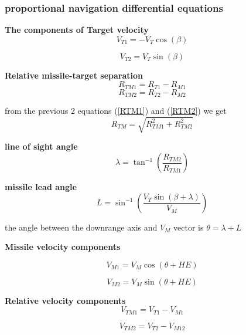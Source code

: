 \subsubsection*{proportional navigation differential equations}

\textbf{The components of Target velocity} 
\begin{equation}
V_{T1} = - V_T \cos(\beta)
\end{equation}

\begin{equation}
V_{T2} =  V_T \sin(\beta)
\end{equation}

\textbf{Relative missile-target separation}
\begin{equation}
R_{TM1} = R_{T1} - R_{M1}
\label{RTM1}
\end{equation}
\begin{equation}
R_{TM2} = R_{T2} - R_{M2}
\label{RTM2}
\end{equation}

from the previous 2 equations (\ref{RTM1}) and (\ref{RTM2}) we get
\begin{equation}
R_{TM} = \sqrt{R_{TM1}^2 + R_{TM2}^2}
\label{RTM}
\end{equation}

\textbf{line of sight angle}
\begin{equation}
\lambda = \tan^{-1} (\dfrac{R_{TM2}}{R_{TM1}})
\label{lambda}
\end{equation}

\textbf{missile lead angle} 
\begin{equation}
L= \sin^{-1}(\dfrac{V_T \sin(\beta + \lambda)}{V_M})
\end{equation}

the angle between the downrange axis and $V_M$ vector is $\theta = \lambda + L$

\textbf{Missile velocity components} 

\begin{equation}
V_{M1} = V_M \cos (\theta + HE)
\end{equation}

\begin{equation}
V_{M2} = V_M \sin (\theta + HE)
\end{equation}

\textbf{Relative velocity components}
\begin{equation}
V_{TM1} = V_{T1} - V_{M1}
\end{equation}

\begin{equation}
V_{TM2} = V_{T2} - V_{M12}
\end{equation}



